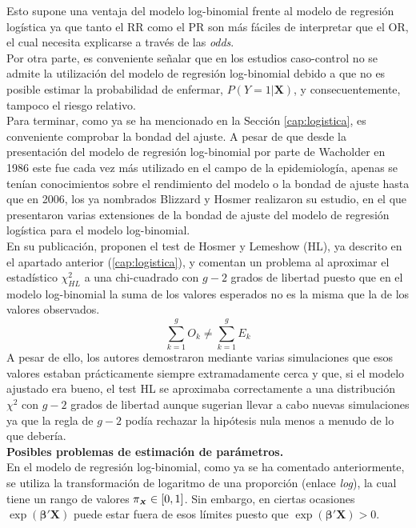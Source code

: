 Esto supone una ventaja del modelo log-binomial frente al modelo de regresión logística ya que tanto el RR como el PR son más fáciles de interpretar que el OR, el cual necesita explicarse a través de las \textit{odds}.\\

Por otra parte, es conveniente señalar que en los estudios caso-control no se admite la utilización del modelo de regresión log-binomial debido a que no es posible estimar la probabilidad de enfermar, $P(Y=1|\boldsymbol{X})$, y consecuentemente, tampoco el riesgo relativo.\\

Para terminar, como ya se ha mencionado en la Sección \ref{cap:logistica}, es conveniente comprobar la bondad del ajuste. A pesar de que desde la presentación del modelo de regresión log-binomial por parte de Wacholder en 1986 este fue cada vez más utilizado en el campo de la epidemiología, apenas se tenían conocimientos sobre el rendimiento del modelo o la bondad de ajuste hasta que en 2006, los ya nombrados Blizzard y Hosmer realizaron su estudio, en el que presentaron varias extensiones de la bondad de ajuste del modelo de regresión logística para el modelo log-binomial. \\

En su publicación, proponen el test de Hosmer y Lemeshow (HL), ya descrito en el apartado anterior (\ref{cap:logistica}), y comentan un problema al aproximar el estadístico $\chi^2_{HL}$ a una chi-cuadrado con $g-2$ grados de libertad puesto que en el modelo log-binomial la suma de los valores esperados no es la misma que la de los valores observados.
\begin{equation*}
\sum_{k=1}^{g} O_k \neq \sum_{k=1}^{g} E_k
\end{equation*}
A pesar de ello, los autores demostraron mediante varias simulaciones que esos valores estaban prácticamente siempre extramadamente cerca y que, si el modelo ajustado era bueno, el test HL se aproximaba correctamente a una distribución $\chi^2$ con $g-2$ grados de libertad aunque sugerian llevar a cabo nuevas simulaciones ya que la regla de $g-2$ podía rechazar la hipótesis nula menos a menudo de lo que debería.\\

 \textbf{Posibles problemas de estimación de parámetros.}\\
[0.3cm]
En el modelo de regresión log-binomial, como ya se ha comentado anteriormente, se utiliza la transformación de logaritmo de una proporción (enlace \textit{log}), la cual tiene un rango de valores $\pi_{\mathsmaller{\boldsymbol{X}}} \in [0,1] $. Sin embargo, en ciertas ocasiones $\exp(\boldsymbol{\beta'X})$ puede estar fuera de esos límites puesto que $\exp(\boldsymbol{\beta'X}) > 0$.\\

